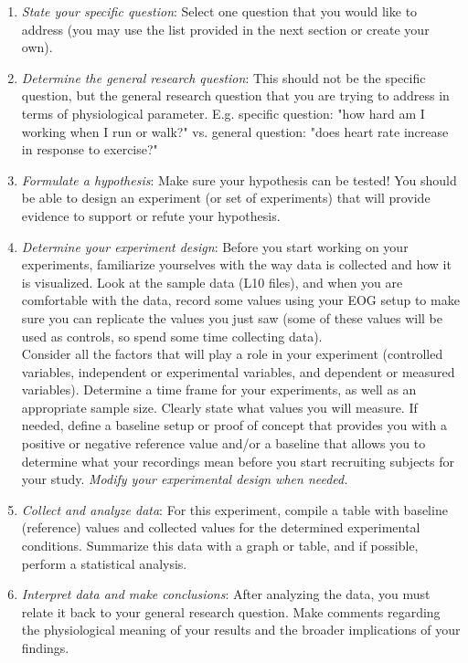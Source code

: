 \documentclass{article}
\begin{document}
\begin{enumerate}
	\item \textit{State your specific question}: Select one question that you would like to address (you may use the list provided in the next section or create your own).
	\item \textit{Determine the general research question}: This should not be the specific question, but the general research question that you are trying to address in terms of physiological parameter. E.g. specific question: "how hard am I working when I run or walk?"  vs. general question: "does heart rate increase in response to exercise?"
	\item \textit{Formulate a hypothesis}: Make sure your hypothesis can be tested! You should be able to design an experiment (or set of experiments) that will provide evidence to support or refute your hypothesis.
	\item \textit{Determine your experiment design}: Before you start working on your experiments, familiarize yourselves with the way data is collected and how it is visualized. Look at the sample data (L10 files), and when you are comfortable with the data, record some values using your EOG setup to make sure you can replicate the values you just saw (some of these values will be used as controls, so spend some time collecting data).\\
		
		Consider all the factors that will play a role in your experiment (controlled variables, independent or experimental variables, and dependent or measured variables). Determine a time frame for your experiments, as well as an appropriate sample size. Clearly state what values you will measure. If needed, define a baseline setup or proof of concept that provides you with a positive or negative reference value and/or a baseline that allows you to determine what your recordings mean before you start recruiting subjects for your study. \textit{Modify your experimental design when needed.}
		
	\item \textit{Collect and analyze data}: For this experiment, compile a table with baseline (reference) values and collected values for the determined experimental conditions. Summarize this data with a graph or table, and if possible, perform a statistical analysis.
	\item \textit{Interpret data and make conclusions}: After analyzing the data, you must relate it back to your general research question. Make comments regarding the physiological meaning of your results and the broader implications of your findings.
\end{enumerate}
\end{document}
